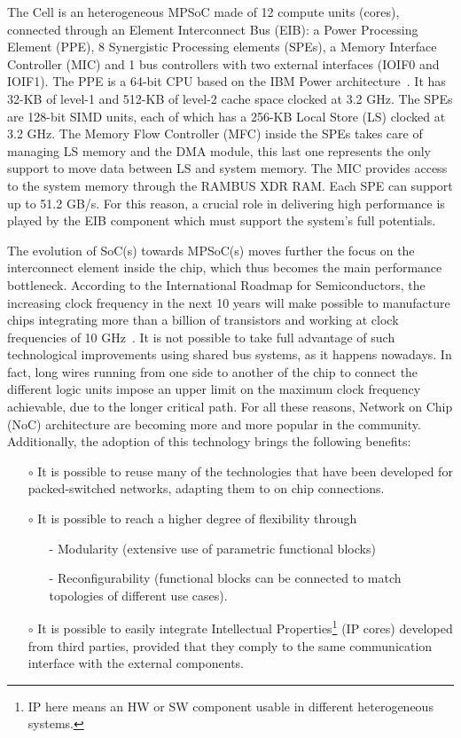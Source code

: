 The Cell is an heterogeneous MPSoC made of 12 compute units (cores), connected through an Element Interconnect Bus (EIB): a Power Processing Element (PPE), 8 Synergistic Processing elements (SPEs), a Memory Interface Controller (MIC) and 1 bus controllers with two external interfaces (IOIF0 and IOIF1). The PPE is a 64-bit CPU based on the IBM Power architecture~\cite{PowerArchitecture}. It has 32-KB of level-1 and 512-KB of level-2 cache space clocked at 3.2 GHz. The SPEs are 128-bit SIMD units, each of which has a 256-KB Local Store (LS) clocked at 3.2 GHz. The Memory Flow Controller (MFC) inside the SPEs takes care of managing LS memory and the DMA module, this last one represents the only support to move data between LS and system memory. The MIC provides access to the system memory through the RAMBUS XDR RAM. Each SPE can support up to 51.2 GB/s. For this reason, a crucial role in delivering high performance is played by the EIB component which must support the system's full potentials.

The evolution of SoC(s) towards MPSoC(s) moves further the focus on the interconnect element inside the chip, which thus becomes the main performance bottleneck. According to the International Roadmap for Semiconductors, the increasing clock frequency in the next 10 years will make possible to manufacture chips integrating more than a billion of transistors and working at clock frequencies of 10 GHz~\cite{ITRS}. It is not possible to take full advantage of such technological improvements using shared bus systems, as it happens nowadays. In fact, long wires running from one side to another of the chip to connect the different logic units impose an upper limit on the maximum clock frequency achievable, due to the longer critical path. For all these reasons, Network on Chip (NoC) architecture are becoming more and more popular in the community. Additionally, the adoption of this technology brings the following benefits:

\begin{itemize}
	\item[$\circ$] It is possible to reuse many of the technologies that have been developed for packed-switched networks, adapting them to on chip connections.
	\item[$\circ$] It is possible to reach a higher degree of flexibility through
	\begin{itemize}
		\item[-] Modularity (extensive use of parametric functional blocks)
		\item[-] Reconfigurability (functional blocks can be connected to match topologies of different use cases).
	\end{itemize}
	\item[$\circ$] It is possible to easily integrate Intellectual Properties\footnote{IP here means an HW or SW component usable in different heterogeneous systems.} (IP cores) developed from third parties, provided that they comply to the same communication interface with the external components.
\end{itemize}

